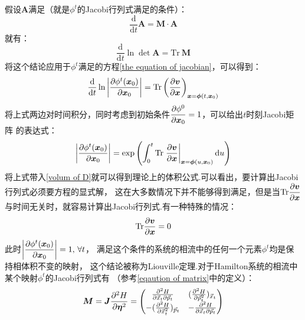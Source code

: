     假设$\bm{A}$满足（就是$\phi^t$的Jacobi行列式满足的条件）：
    \begin{equation}
        \frac {\mathrm{d}}{\mathrm{d}t} \bm{A} = \bm{M}\cdot\bm{A}
        \label{equation of matrix}
    \end{equation}
    就有：
    \begin{equation}
        \frac {\mathrm{d}}{\mathrm{d}t} \ln{\det{\bm{A}}} = \mathrm{Tr}\ \bm{M}
    \end{equation}
    将这个结论应用于$\phi^t$满足的方程\ref{the equation of jacobian}，可以得到：
    \begin{equation}
        \frac{\mathrm{d}{}}{\mathrm{d}{t}}\ln \left|\frac{\partial{\phi^t(\bm{x}_0)}}{\partial{\bm{x}_0}}\right| = \mathrm{Tr}\left(\frac{\partial{\bm{v}}}{\partial{\bm{x}}}\right)_{\bm{x} = \bm{\phi}(t, \bm{x}_0)}
    \end{equation}
    将上式两边对时间积分，同时考虑到初始条件$\displaystyle\frac{\partial{\phi^0}}{\partial{\bm{x}_0}} = 1$，可以给出$t$时刻Jacobi矩阵
    的表达式：
    \begin{equation}
        \left|\frac{\partial{\phi^t(\bm{x}_0)}}{\partial{\bm{x}_{0}}}\right| = \exp\left(\int_{0}^{t}\mathrm{Tr}\left.
        \frac{\partial{\bm{v}}}{\partial{\bm{x}}}\right|_{\bm{x} = \bm{\phi}(u, \bm{x}_0)}\mathrm{d} u\right)
        \label{expression of jacobian}
    \end{equation}
    将上式带入\ref{volum of D}就可以得到理论上的体积公式.可以看出，要计算出Jacobi行列式必须要方程的显式解，
    这在大多数情况下并不能够得到满足，但是当$\displaystyle\mathrm{Tr}\frac{\partial{\bm{v}}}{\partial{\bm{x}}}$
    与时间无关时，就容易计算出Jacobi行列式.有一种特殊的情况：
    \begin{equation}
        \mathrm{Tr}\frac{\partial{\bm{v}}}{\partial{\bm{x}}} = 0
    \end{equation}
    此时$\displaystyle\left|\frac{\partial{\phi^t(\bm{x}_0)}}{\partial{\bm{x}_0}}\right| = 1,\, \forall t$，
    满足这个条件的系统的相流中的任何一个元素$\phi^t$均是保持相体积不变的映射，
    这个结论被称为Liouville定理.对于Hamilton系统的相流中某个映射$\phi^t$的Jacobi行列式有
    （参考\ref{eqaution of matrix}中的定义）：
    \begin{equation}
        \bm{M} = \bm{J} \frac{\partial{^2 H}}{\partial{\bm{\eta}^2}}=
        \begin{pmatrix}
        \frac {\partial^2 H}{\partial \vec{x}_t \partial \vec{p}_t} & (\frac {\partial^2 H}{\partial \vec{p}_t^2})_{\vec{x}_t}\\
        -(\frac {\partial^2 H}{\partial \vec{x}_t^2})_{\vec{p}_t} & - \frac {\partial^2 H}{\partial \vec{x}_t \partial \vec{p}_t}
        \end{pmatrix}
    \end{equation}
